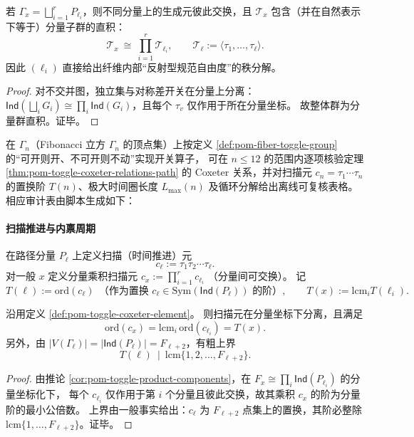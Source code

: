 \begin{corollary}\label{cor:pom-toggle-product-components}
若 \(\Gamma_x=\bigsqcup_{i=1}^r P_{\ell_i}\)，则不同分量上的生成元彼此交换，且 \(\mathcal T_x\) 包含（并在自然表示下等于）分量子群的直积：
\[
\mathcal T_x\ \cong\ \prod_{i=1}^r \mathcal T_{\ell_i},
\qquad
\mathcal T_{\ell}:=\langle \tau_1,\dots,\tau_{\ell}\rangle.
\]
因此 \((\ell_i)\) 直接给出纤维内部“反射型规范自由度”的秩分解。
\end{corollary}
\begin{proof}
对不交并图，独立集与对称差开关在分量上分离：\(\mathsf{Ind}(\bigsqcup_i G_i)\cong\prod_i\mathsf{Ind}(G_i)\)，且每个 \(\tau_v\) 仅作用于所在分量坐标。
故整体群为分量群直积。证毕。
\end{proof}

\begin{remark}[有限窗审计]\label{rem:pom-toggle-coxeter-audit}
在 \(\Gamma_n\)（Fibonacci 立方 \(\Gamma_n\) 的顶点集）上按定义 \ref{def:pom-fiber-toggle-group} 的“可开则开、不可开则不动”实现开关算子，
可在 \(n\le 12\) 的范围内逐项核验定理 \ref{thm:pom-toggle-coxeter-relations-path} 的 Coxeter 关系，并对扫描元 \(c_n=\tau_1\cdots\tau_n\) 的置换阶 \(T(n)\)、极大时间圈长度 \(L_{\max}(n)\) 及循环分解给出离线可复核表格。
相应审计表由脚本生成如下：

\end{remark}

\paragraph{扫描推进与内禀周期}

\begin{definition}[扫描元与内禀周期不变量]\label{def:pom-toggle-coxeter-element}
在路径分量 \(P_{\ell}\) 上定义扫描（时间推进）元
\[
c_{\ell}:=\tau_1\tau_2\cdots\tau_{\ell}.
\]
对一般 \(x\) 定义分量乘积扫描元
\(
c_x:=\prod_{i=1}^r c_{\ell_i}
\)
（分量间可交换）。
\noindent 记
\[
T(\ell):=\mathrm{ord}(c_\ell)\ \ \text{（作为置换 \(c_\ell\in\mathrm{Sym}(\mathsf{Ind}(P_\ell))\) 的阶）},
\qquad
T(x):=\mathrm{lcm}_{i} T(\ell_i).
\]
\end{definition}

\begin{theorem}\label{thm:pom-toggle-coxeter-order-bound}
沿用定义 \ref{def:pom-toggle-coxeter-element}。
则扫描元在分量坐标下分离，且满足
\[
\mathrm{ord}(c_x)=\mathrm{lcm}_{i}\,\mathrm{ord}(c_{\ell_i})=T(x).
\]
\noindent 另外，由 \(|V(\Gamma_\ell)|=|\mathsf{Ind}(P_\ell)|=F_{\ell+2}\)，有粗上界
\[
T(\ell)\ \mid\ \mathrm{lcm}\{1,2,\dots,F_{\ell+2}\}.
\]
\end{theorem}
\begin{proof}
由推论 \ref{cor:pom-toggle-product-components}，在 \(F_x\cong \prod_i \mathsf{Ind}(P_{\ell_i})\) 的分量坐标化下，
每个 \(c_{\ell_i}\) 仅作用于第 \(i\) 个分量且彼此交换，故其乘积 \(c_x\) 的阶为分量阶的最小公倍数。
上界由一般事实给出：\(c_\ell\) 为 \(F_{\ell+2}\) 点集上的置换，其阶必整除 \(\mathrm{lcm}\{1,\dots,F_{\ell+2}\}\)。证毕。
\end{proof}


